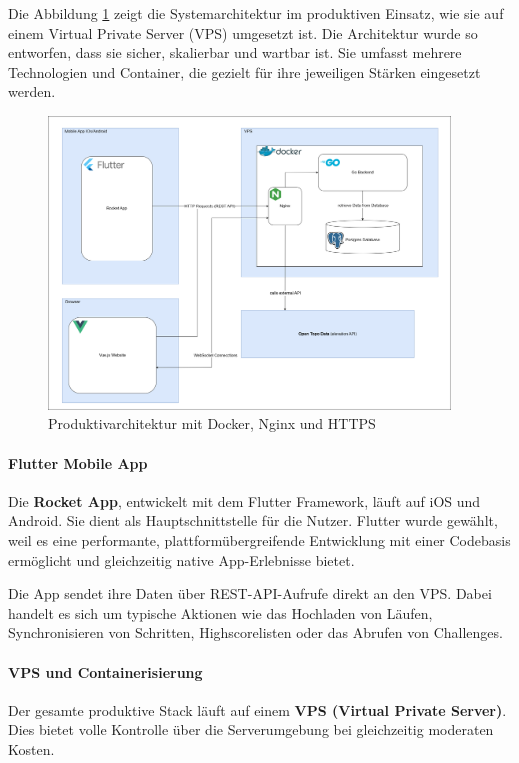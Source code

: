 \documentclass[11pt,a4paper]{article}
\begin{document}
Die Abbildung \ref{fig:https-architektur} zeigt die Systemarchitektur im produktiven Einsatz, wie sie auf einem Virtual Private Server (VPS) umgesetzt ist. Die Architektur wurde so entworfen, dass sie sicher, skalierbar und wartbar ist. Sie umfasst mehrere Technologien und Container, die gezielt für ihre jeweiligen Stärken eingesetzt werden.

\begin{figure}[H]
    \centering
    \includegraphics[width=0.95\textwidth]{images/HttpsArchitektur.png}
    \caption{Produktivarchitektur mit Docker, Nginx und HTTPS}
    \label{fig:https-architektur}
\end{figure}

\paragraph{Flutter Mobile App}
Die \textbf{Rocket App}, entwickelt mit dem Flutter Framework, läuft auf iOS und Android. Sie dient als Hauptschnittstelle für die Nutzer. Flutter wurde gewählt, weil es eine performante, plattformübergreifende Entwicklung mit einer Codebasis ermöglicht und gleichzeitig native App-Erlebnisse bietet.

Die App sendet ihre Daten  über REST-API-Aufrufe direkt an den VPS. Dabei handelt es sich um typische Aktionen wie das Hochladen von Läufen, Synchronisieren von Schritten, Highscorelisten oder das Abrufen von Challenges.

\paragraph{VPS und Containerisierung}
Der gesamte produktive Stack läuft auf einem \textbf{VPS (Virtual Private Server)}. Dies bietet volle Kontrolle über die Serverumgebung bei gleichzeitig moderaten Kosten.
\end{document}
